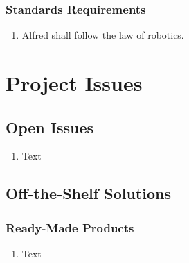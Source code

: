 \documentclass [11pt]{article}
\begin{document}
\subsubsection{Standards Requirements }
	\begin{enumerate}[label=\textbf{(\roman*)}]
		\item Alfred shall follow the law of robotics.
	\end{enumerate}


\section {Project Issues} 

\subsection{Open Issues}
	\begin{enumerate}[label=\textbf{(\roman*)}]
		\item Text
	\end{enumerate}

\subsection{Off-the-Shelf Solutions}

\subsubsection{Ready-Made Products}
	\begin{enumerate}[label=\textbf{(\roman*)}]
		\item Text
	\end{enumerate}

\end{document}
